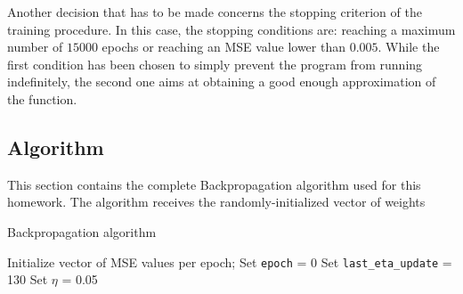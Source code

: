 \documentclass[12pt]{article}
\begin{document}
Another decision that has to be made concerns the stopping criterion of the training procedure.
In this case, the stopping conditions are: reaching a maximum number of $15000$ epochs or reaching an MSE value lower than $0.005$.
While the first condition has been chosen to simply prevent the program from running indefinitely, the second one aims at obtaining a good enough approximation of the function.

\subsection{Algorithm}

This section contains the complete Backpropagation algorithm used for this homework.
The algorithm receives the randomly-initialized vector of weights

\begin{algorithm}
  \caption{Backpropagation algorithm}
  \label{alg:bp}
  \begin{algorithmic}[1]
    \State Initialize vector of MSE values per epoch;
    \State Set \verb|epoch| = 0
    \State Set \verb|last_eta_update| = 130
    \State Set $\eta$ = 0.05
  \end{algorithmic}
\end{algorithm}
\end{document}
